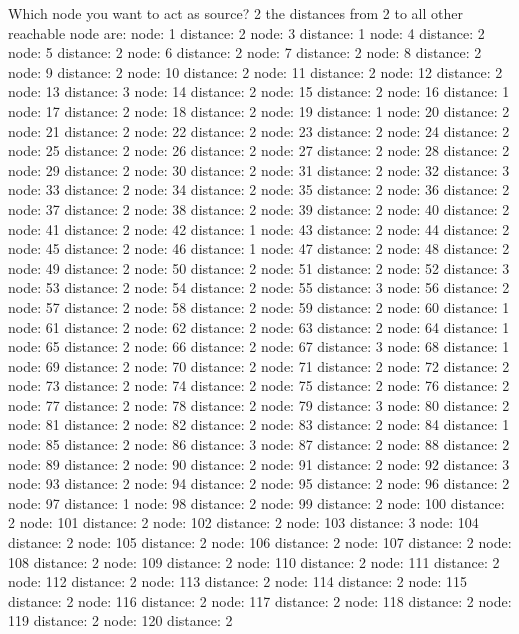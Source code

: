 \documentclass{article}
\begin{document}
Which node you want to act as source?
2
the distances from 2 to all other reachable node are:
node: 1 distance: 2
node: 3 distance: 1
node: 4 distance: 2
node: 5 distance: 2
node: 6 distance: 2
node: 7 distance: 2
node: 8 distance: 2
node: 9 distance: 2
node: 10 distance: 2
node: 11 distance: 2
node: 12 distance: 2
node: 13 distance: 3
node: 14 distance: 2
node: 15 distance: 2
node: 16 distance: 1
node: 17 distance: 2
node: 18 distance: 2
node: 19 distance: 1
node: 20 distance: 2
node: 21 distance: 2
node: 22 distance: 2
node: 23 distance: 2
node: 24 distance: 2
node: 25 distance: 2
node: 26 distance: 2
node: 27 distance: 2
node: 28 distance: 2
node: 29 distance: 2
node: 30 distance: 2
node: 31 distance: 2
node: 32 distance: 3
node: 33 distance: 2
node: 34 distance: 2
node: 35 distance: 2
node: 36 distance: 2
node: 37 distance: 2
node: 38 distance: 2
node: 39 distance: 2
node: 40 distance: 2
node: 41 distance: 2
node: 42 distance: 1
node: 43 distance: 2
node: 44 distance: 2
node: 45 distance: 2
node: 46 distance: 1
node: 47 distance: 2
node: 48 distance: 2
node: 49 distance: 2
node: 50 distance: 2
node: 51 distance: 2
node: 52 distance: 3
node: 53 distance: 2
node: 54 distance: 2
node: 55 distance: 3
node: 56 distance: 2
node: 57 distance: 2
node: 58 distance: 2
node: 59 distance: 2
node: 60 distance: 1
node: 61 distance: 2
node: 62 distance: 2
node: 63 distance: 2
node: 64 distance: 1
node: 65 distance: 2
node: 66 distance: 2
node: 67 distance: 3
node: 68 distance: 1
node: 69 distance: 2
node: 70 distance: 2
node: 71 distance: 2
node: 72 distance: 2
node: 73 distance: 2
node: 74 distance: 2
node: 75 distance: 2
node: 76 distance: 2
node: 77 distance: 2
node: 78 distance: 2
node: 79 distance: 3
node: 80 distance: 2
node: 81 distance: 2
node: 82 distance: 2
node: 83 distance: 2
node: 84 distance: 1
node: 85 distance: 2
node: 86 distance: 3
node: 87 distance: 2
node: 88 distance: 2
node: 89 distance: 2
node: 90 distance: 2
node: 91 distance: 2
node: 92 distance: 3
node: 93 distance: 2
node: 94 distance: 2
node: 95 distance: 2
node: 96 distance: 2
node: 97 distance: 1
node: 98 distance: 2
node: 99 distance: 2
node: 100 distance: 2
node: 101 distance: 2
node: 102 distance: 2
node: 103 distance: 3
node: 104 distance: 2
node: 105 distance: 2
node: 106 distance: 2
node: 107 distance: 2
node: 108 distance: 2
node: 109 distance: 2
node: 110 distance: 2
node: 111 distance: 2
node: 112 distance: 2
node: 113 distance: 2
node: 114 distance: 2
node: 115 distance: 2
node: 116 distance: 2
node: 117 distance: 2
node: 118 distance: 2
node: 119 distance: 2
node: 120 distance: 2
\end{document}
